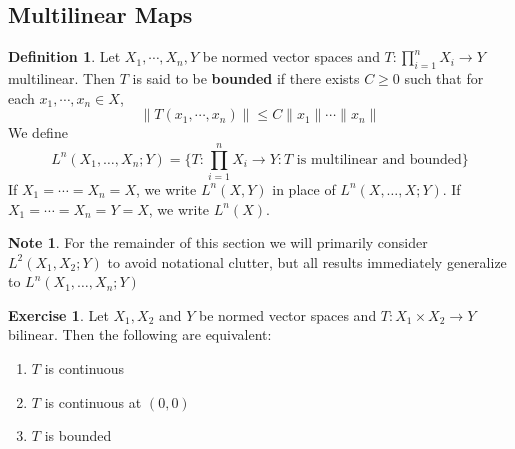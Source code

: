 \documentclass[12pt]{amsart}
\theoremstyle{definition}
\newtheorem{defn}[definition]{Definition}
\newtheorem{note}[definition]{Note}
\newtheorem{ex}[definition]{Exercise}
\newcommand{\lex}[1]{\label{ex:#1}}
\newcommand{\ld}[1]{\label{defn:#1}}
\begin{document}
	\subsection{Multilinear Maps}	
	\begin{defn} \ld{43001}
	Let $X_1, \cdots, X_n, Y$ be normed vector spaces and $T: \prod\limits_{i=1}^n X_i \rightarrow Y$ multilinear. Then $T$ is said to be \textbf{bounded} if there exists $C \geq 0$ such that for each $x_1, \cdots, x_n \in X$, $$\|T(x_1, \cdots, x_n)\| \leq C \|x_1\| \cdots \|x_n\|$$
	We define $$L^n (X_1, \dots, X_n; Y) = \bigg\{T: \prod\limits_{i=1}^n X_i \rightarrow Y: T \text{ is multilinear and bounded}\bigg \}$$ 
	If $X_1 = \cdots = X_n = X$, we write $L^n(X,Y)$ in place of $L^n (X, \dots, X; Y) $. If $X_1 = \cdots = X_n = Y =  X$, we write $L^n(X)$. 
	\end{defn}
	
	\begin{note}
	For the remainder of this section we will primarily consider $L^2(X_1, X_2; Y)$ to avoid notational clutter, but all results immediately generalize to $L^n(X_1, \ldots, X_n;Y)$
	\end{note}
	
	\begin{ex} \lex{43002}
	Let $X_1, X_2$ and $Y$ be normed vector spaces and $T: X_1 \times X_2 \rightarrow Y$ bilinear. Then the following are equivalent:
	\begin{enumerate}
			\item $T$ is continuous
			\item $T$ is continuous at $(0,0)$
			\item $T$ is bounded
		\end{enumerate}
	\end{ex}
	
\end{document}
